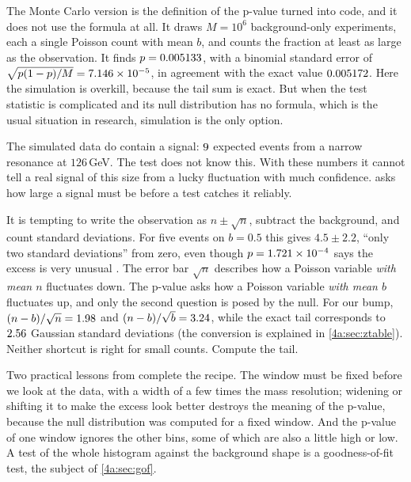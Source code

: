 The Monte Carlo version is the definition of the p-value turned into code, and
it does not use the formula at all. It draws $M=10^6$ background-only
experiments, each a single Poisson count with mean $b$, and counts the
fraction at least as large as the observation. It finds $p=0.005133$,
with a binomial standard error of $\sqrt{p(1-p)/M}=7.146\times10^{-5}$, in
agreement with the exact value $0.005172$. Here the simulation is overkill,
because the tail sum is exact. But when the test statistic is complicated and
its null distribution has no formula, which is the usual situation in
research, simulation is the only option.

The simulated data do contain a signal: $9$ expected events from
a narrow resonance at $126\,$GeV. The test does not know this. With these
numbers it cannot tell a real signal of this size from a lucky fluctuation
with much confidence.  asks how large a signal must be
before a test catches it reliably.

\begin{pitfall}
It is tempting to write the observation as $n\pm\sqrt n$, subtract the
background, and count standard deviations. For five events on $b=0.5$ this
gives $4.5\pm2.2$, ``only two standard deviations'' from zero, even though
$p=1.721\times10^{-4}$ says the excess is very unusual .
The error bar $\sqrt n$ describes how a Poisson variable \emph{with mean $n$}
fluctuates down. The p-value asks how a Poisson variable \emph{with mean $b$}
fluctuates up, and only the second question is posed by the null. For our
bump, $(n-b)/\sqrt n=1.98$ and $(n-b)/\sqrt b=3.24$,
while the exact tail corresponds to $2.56$ Gaussian standard
deviations (the conversion is explained in \cref{4a:sec:ztable}). Neither
shortcut is right for small counts. Compute the tail.
\end{pitfall}

Two practical lessons from  complete the recipe. The
window must be fixed before we look at the data, with a width of a few times
the mass resolution; widening or shifting it to make the excess look better
destroys the meaning of the p-value, because the null distribution was
computed for a fixed window. And the p-value of one window ignores the
other bins, some of which are also a little high or low. A test of the whole
histogram against the background shape is a goodness-of-fit test, the subject
of \cref{4a:sec:gof}.
